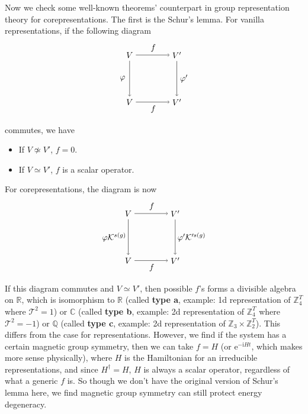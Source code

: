 \documentclass[hyperref, a4paper]{article}
\newcommand*{\ii}{\mathrm{i}}
\newcommand*{\ee}{\mathrm{e}}
\newcommand*{\concept}[1]{{\textbf{#1}}}
\begin{document}
Now we check some well-known theorems' counterpart in group representation theory for corepresentations.
The first is the Schur's lemma. For vanilla representations, if the following diagram 
\begin{equation}
    \begin{gathered}
        \begin{tikzpicture}
            \node (A) at (-1, 1) {$V$};
            \node (B) at (1, 1) {$V'$};
            \draw[->] (A) -- (B);
            \node at (0, 1.3) {$f$};
            \node (C) at (-1, -1) {$V$};
            \draw[->] (A) -- (C);
            \node (D) at (1, -1) {$V'$};
            \node at (0, -1.3) {$f$};
            \draw[->] (C) -- (D);
            \draw[->] (B) -- (D);
            \node at (-1.3, 0) {$\varphi$};
            \node at (1.3, 0) {$\varphi'$};
        \end{tikzpicture}
    \end{gathered}
\end{equation}  
commutes, we have
\begin{itemize}
    \item If $V \not\simeq V'$, $f = 0$.
    \item If $V \simeq V'$, $f$ is a scalar operator.
\end{itemize} 
For corepresentations, the diagram is now 
\begin{equation}
    \begin{gathered}
        \begin{tikzpicture}
            \node (A) at (-1, 1) {$V$};
            \node (B) at (1, 1) {$V'$};
            \draw[->] (A) -- (B);
            \node at (0, 1.3) {$f$};
            \node (C) at (-1, -1) {$V$};
            \draw[->] (A) -- (C);
            \node (D) at (1, -1) {$V'$};
            \node at (0, -1.3) {$f$};
            \draw[->] (C) -- (D);
            \draw[->] (B) -- (D);
            \node at (-1.6, 0) {$\varphi \mathcal{K}^{s(g)}$};
            \node at (1.7, 0) {$\varphi' \mathcal{K}'^{s(g)}$};
        \end{tikzpicture}
    \end{gathered}
\end{equation}  
If this diagram commutes and $V \simeq V'$, then possible $f$'s forms a divisible algebra on $\mathbb{R}$, which is isomorphism
to $\mathbb{R}$ (called \concept{type a}, example: 1d representation of $\mathbb{Z}_4^T$ where $\mathcal{T}^2 = 1$) or $\mathbb{C}$ (called \concept{type b}, example: 2d representation of $\mathbb{Z}_4^T$ where $\mathcal{T}^2 = -1$) or $\mathbb{Q}$ (called \concept{type c}, example: 2d representation of $\mathbb{Z}_3 \times \mathbb{Z}_2^T$). This differs from the case for representations.
However, we find if the system has a certain magnetic group symmetry, then 
we can take $f = H$ (or $\ee^{- \ii H t}$, which makes more sense physically), where $H$ is the Hamiltonian for an irreducible representations, 
and since $H^\dagger = H$, $H$ is always a scalar operator, regardless of what a generic $f$ is.
So though we don't have the original version of Schur's lemma here, we find magnetic group symmetry can 
still protect energy degeneracy.
\end{document}
